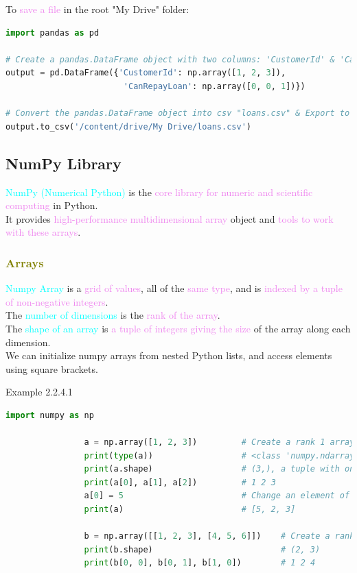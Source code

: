 \documentclass{book}
\begin{document}
    To \textcolor{violet}{save a file} in the root "My Drive" folder:
    \begin{lstlisting}[language=Python, basicstyle=\ttfamily\small, keywordstyle=\color{blue}, commentstyle=\color{forestgreen}, stringstyle=\color{red}, showstringspaces=false]
import pandas as pd

# Create a pandas.DataFrame object with two columns: 'CustomerId' & 'CanRepayLoan'.
output = pd.DataFrame({'CustomerId': np.array([1, 2, 3]),
                        'CanRepayLoan': np.array([0, 0, 1])})

# Convert the pandas.DataFrame object into csv "loans.csv" & Export to the root "My Drive" folder.
output.to_csv('/content/drive/My Drive/loans.csv')
    \end{lstlisting}
\subsection{NumPy Library}
\textcolor{cyan}{NumPy (Numerical Python)} is the \textcolor{violet}{core library for numeric and scientific computing} in Python.\\
It provides \textcolor{violet}{high-performance multidimensional array} object and \textcolor{violet}{tools to work with these arrays}.\\
\newpage
\textcolor{olive}{\subsubsection{Arrays}}
\textcolor{cyan}{Numpy Array} is a \textcolor{violet}{grid of values}, all of the \textcolor{violet}{same type}, and is \textcolor{violet}{indexed by a tuple of non-negative integers}.\\
The \textcolor{cyan}{number of dimensions} is the \textcolor{violet}{rank of the array}. \\
The \textcolor{cyan}{shape of an array} is \textcolor{violet}{a tuple of integers giving the size} of the array along each dimension.\\
We can initialize numpy arrays from nested Python lists, and access elements using square brackets.
\begin{egBox}{Example 2.2.4.1}{}
    \begin{lstlisting}[language=Python, basicstyle=\ttfamily\small, keywordstyle=\color{blue}, commentstyle=\color{forestgreen}, stringstyle=\color{red}, showstringspaces=false]
                import numpy as np

                a = np.array([1, 2, 3])         # Create a rank 1 array
                print(type(a))                  # <class 'numpy.ndarray'>
                print(a.shape)                  # (3,), a tuple with one element
                print(a[0], a[1], a[2])         # 1 2 3
                a[0] = 5                        # Change an element of the array
                print(a)                        # [5, 2, 3]

                b = np.array([[1, 2, 3], [4, 5, 6]])    # Create a rank 2 array
                print(b.shape)                          # (2, 3)
                print(b[0, 0], b[0, 1], b[1, 0])        # 1 2 4
    \end{lstlisting}
\end{egBox}
\end{document}
